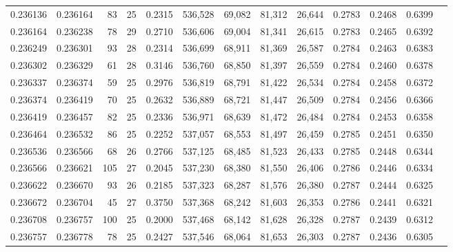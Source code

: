 \begin{tabular}{rrrrrrrrrrrrr}
0.236136 & 0.236164 &  83 &  25 &                                     0.2315 & 536,528 &  69,082 &  81,312 &  26,644 & 0.2783 & 0.2468 & 0.6399 \\
0.236164 & 0.236238 &  78 &  29 &                                     0.2710 & 536,606 &  69,004 &  81,341 &  26,615 & 0.2783 & 0.2465 & 0.6392 \\
0.236249 & 0.236301 &  93 &  28 &                                     0.2314 & 536,699 &  68,911 &  81,369 &  26,587 & 0.2784 & 0.2463 & 0.6383 \\
0.236302 & 0.236329 &  61 &  28 &                                     0.3146 & 536,760 &  68,850 &  81,397 &  26,559 & 0.2784 & 0.2460 & 0.6378 \\
0.236337 & 0.236374 &  59 &  25 &                                     0.2976 & 536,819 &  68,791 &  81,422 &  26,534 & 0.2784 & 0.2458 & 0.6372 \\
0.236374 & 0.236419 &  70 &  25 &                                     0.2632 & 536,889 &  68,721 &  81,447 &  26,509 & 0.2784 & 0.2456 & 0.6366 \\
0.236419 & 0.236457 &  82 &  25 &                                     0.2336 & 536,971 &  68,639 &  81,472 &  26,484 & 0.2784 & 0.2453 & 0.6358 \\
0.236464 & 0.236532 &  86 &  25 &                                     0.2252 & 537,057 &  68,553 &  81,497 &  26,459 & 0.2785 & 0.2451 & 0.6350 \\
0.236536 & 0.236566 &  68 &  26 &                                     0.2766 & 537,125 &  68,485 &  81,523 &  26,433 & 0.2785 & 0.2448 & 0.6344 \\
0.236566 & 0.236621 & 105 &  27 &                                     0.2045 & 537,230 &  68,380 &  81,550 &  26,406 & 0.2786 & 0.2446 & 0.6334 \\
0.236622 & 0.236670 &  93 &  26 &                                     0.2185 & 537,323 &  68,287 &  81,576 &  26,380 & 0.2787 & 0.2444 & 0.6325 \\
0.236672 & 0.236704 &  45 &  27 &                                     0.3750 & 537,368 &  68,242 &  81,603 &  26,353 & 0.2786 & 0.2441 & 0.6321 \\
0.236708 & 0.236757 & 100 &  25 &                                     0.2000 & 537,468 &  68,142 &  81,628 &  26,328 & 0.2787 & 0.2439 & 0.6312 \\
0.236757 & 0.236778 &  78 &  25 &                                     0.2427 & 537,546 &  68,064 &  81,653 &  26,303 & 0.2787 & 0.2436 & 0.6305 \\

\end{tabular}
